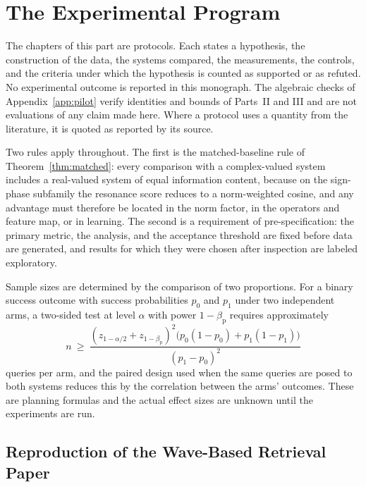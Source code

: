 \part{The Experimental Program}

The chapters of this part are protocols. Each states a hypothesis, the construction of the data, the systems compared, the measurements, the controls, and the criteria under which the hypothesis is counted as supported or as refuted. No experimental outcome is reported in this monograph. The algebraic checks of Appendix~\ref{app:pilot} verify identities and bounds of Parts~II and III and are not evaluations of any claim made here. Where a protocol uses a quantity from the literature, it is quoted as reported by its source.

Two rules apply throughout. The first is the matched-baseline rule of Theorem~\ref{thm:matched}: every comparison with a complex-valued system includes a real-valued system of equal information content, because on the sign-phase subfamily the resonance score reduces to a norm-weighted cosine, and any advantage must therefore be located in the norm factor, in the operators and feature map, or in learning. The second is a requirement of pre-specification: the primary metric, the analysis, and the acceptance threshold are fixed before data are generated, and results for which they were chosen after inspection are labeled exploratory.

Sample sizes are determined by the comparison of two proportions. For a binary success outcome with success probabilities $p_0$ and $p_1$ under two independent arms, a two-sided test at level $\alpha$ with power $1-\beta_{\mathrm{p}}$ requires approximately
\begin{equation}\label{eq:samplesize}
n\ \ge\ \frac{(z_{1-\alpha/2}+z_{1-\beta_{\mathrm p}})^2\bigl(p_0(1-p_0)+p_1(1-p_1)\bigr)}{(p_1-p_0)^2}
\end{equation}
queries per arm, and the paired design used when the same queries are posed to both systems reduces this by the correlation between the arms' outcomes. These are planning formulas and the actual effect sizes are unknown until the experiments are run.

\chapter{Reproduction of the Wave-Based Retrieval Paper}\label{ch:repro}

